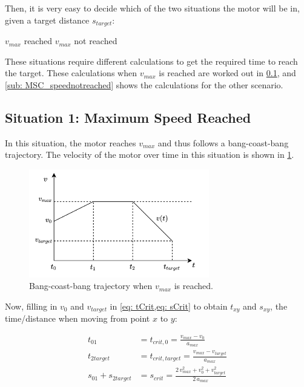 \noindent Then, it is very easy to decide which of the two situations the motor will be in, given a target distance $s_{target}$:
\medskip
\begin{algorithmic}
    \State $v_{max}$ reached
\Else
    \State $v_{max}$ not reached
\EndIf 
\end{algorithmic}
 \medskip
\noindent These situations require different calculations to get the required time to reach the target. These calculations when $v_{max}$ is reached are worked out in \cref{sub: MSC_speedreached}, and \cref{sub: MSC_speednotreached} shows the calculations for the other scenario.


\subsection{Situation 1: Maximum Speed Reached} \label{sub: MSC_speedreached}
\noindent In this situation, the motor reaches $v_{max}$ and thus follows a bang-coast-bang trajectory. The velocity of the motor over time in this situation is shown in \cref{fig: MSC_BCB}.
\begin{figure}[H]
    \centering
    \includegraphics[width=0.7\textwidth]{figures/MotorSpeedCalculations/MSC_BCB_trajectory.png}
    \caption{Bang-coast-bang trajectory when $v_{max}$ is reached.}
    \label{fig: MSC_BCB}
\end{figure}

\noindent Now, filling in $v_0$ and $v_{target}$ in \cref{eq: tCrit,eq: sCrit} to obtain $t_{xy}$ and $s_{xy}$, the time/distance when moving from point $x$ to $y$:

\begin{align*}
    t_{01} &= t_{crit,0} = \frac{v_{max} - v_0}{a_{max}} \\
    t_{2target} &= t_{crit,target} = \frac{v_{max} - v_{target}}{a_{max}} \\
    s_{01} + s_{2target} &= s_{crit} = \frac{2 \, v_{max}^2+v_0^2 + v_{target}^2}{2 \, a_{max}}
\end{align*}

